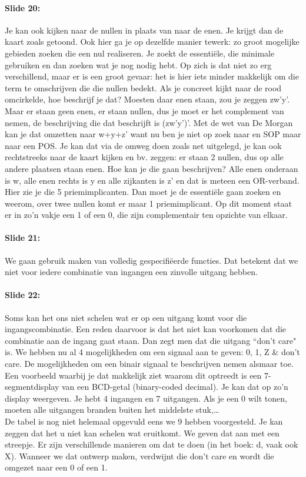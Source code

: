 \documentclass[10pt,a4paper]{book}
\begin{document}
\paragraph{Slide 20:} Je kan ook kijken naar de nullen in plaats van naar de enen. Je krijgt dan de kaart zoals getoond. Ook hier ga je op dezelfde manier tewerk: zo groot mogelijke gebieden zoeken die een nul realiseren. Je zoekt de essenti\"ele, die minimale gebruiken en dan zoeken wat je nog nodig hebt. Op zich is dat niet zo erg verschillend, maar er is een groot gevaar: het is hier iets minder makkelijk om die term te omschrijven die die nullen bedekt. Als je concreet kijkt naar de rood omcirkelde, hoe beschrijf je dat? Moesten daar enen staan, zou je zeggen zw'y'. Maar er staan geen enen, er staan nullen, dus je moet er het complement van nemen, de beschrijving die dat beschrijft is (zw'y')'. Met de wet van De Morgan kan je dat omzetten naar w+y+z' want nu ben je niet op zoek naar en SOP maar naar een POS. Je kan dat via de omweg doen zoals net uitgelegd, je kan ook rechtstreeks naar de kaart kijken en bv. zeggen: er staan 2 nullen, dus op alle andere plaatsen staan enen. Hoe kan je die gaan beschrijven? Alle enen onderaan is w, alle enen rechts is y en alle zijkanten is z' en dat is meteen een OR-verband.\\
Hier zie je die 5 priemimplicanten. Dan moet je de essenti\"ele gaan zoeken en weerom, over twee nullen komt er maar 1 priemimplicant. Op dit moment staat er in zo'n vakje een 1 of een 0, die zijn complementair ten opzichte van elkaar. 

\paragraph{Slide 21:} We gaan gebruik maken van volledig gespecifi\"eerde functies. Dat betekent dat we niet voor iedere combinatie van ingangen een zinvolle uitgang hebben.

\paragraph{Slide 22:} Soms kan het ons niet schelen wat er op een uitgang komt voor die ingangscombinatie. Een reden daarvoor is dat het niet kan voorkomen dat die combinatie aan de ingang gaat staan. Dan zegt men dat die uitgang ``don't  care" is. We hebben nu al 4 mogelijkheden om een signaal aan te geven: 0, 1, Z \& don't care. De mogelijkheden om een binair signaal te beschrijven nemen alsmaar toe. Een voorbeeld waarbij je dat makkelijk ziet waarom dit optreedt is een 7-segmentdisplay van een BCD-getal (binary-coded decimal). Je kan dat op zo'n display weergeven. Je hebt 4 ingangen en 7 uitgangen. Als je een 0 wilt tonen, moeten alle uitgangen branden buiten het middelste stuk,\ldots \\
De tabel is nog niet helemaal opgevuld eens we 9 hebben voorgesteld. Je kan zeggen dat het u niet kan schelen wat eruitkomt. We geven dat aan met een streepje. Er zijn verschillende manieren om dat te doen (in het boek: d, vaak ook X). Wanneer we dat ontwerp maken, verdwijnt die don't care en wordt die omgezet naar een 0 of een 1.
\end{document}
